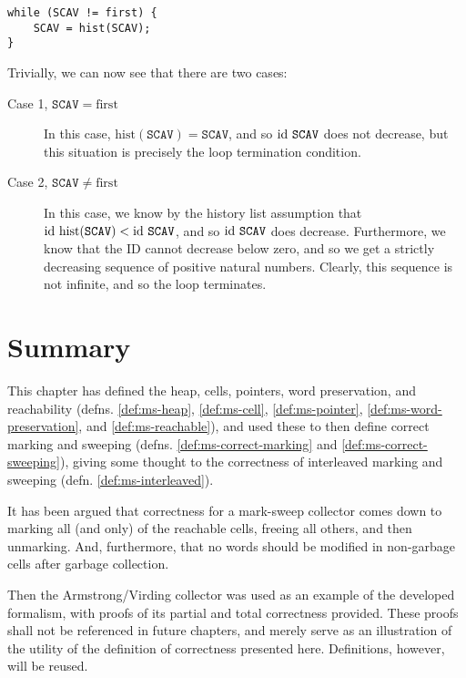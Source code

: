 \begin{lstlisting}
while (SCAV != first) {
    SCAV = hist(SCAV);
}
\end{lstlisting}

Trivially, we can now see that there are two cases:

\begin{description}
  \item[Case 1, $\mathtt{SCAV} = \mathrm{first}$] In this case,
    $\mathrm{hist}(\mathtt{SCAV}) = \mathtt{SCAV}$, and so
    $\mathrm{id}~\mathtt{SCAV}$ does not decrease, but this situation is
    precisely the loop termination condition.

  \item[Case 2, $\mathtt{SCAV} \neq \mathrm{first}$] In this case, we
    know by the history list assumption that
    $\mathrm{id}~\mathrm{hist}(\mathtt{SCAV}) < \mathrm{id}~\mathtt{SCAV}$, and so
    $\mathrm{id}~\mathtt{SCAV}$ does decrease. Furthermore, we know that the
    ID cannot decrease below zero, and so we get a strictly decreasing
    sequence of positive natural numbers. Clearly, this sequence is
    not infinite, and so the loop terminates.
\end{description}

\section{Summary}
\label{sec:marksweep-summary}

This chapter has defined the heap, cells, pointers, word preservation,
and reachability (defns.  \ref{def:ms-heap}, \ref{def:ms-cell},
\ref{def:ms-pointer}, \ref{def:ms-word-preservation}, and
\ref{def:ms-reachable}), and used these to then define correct marking
and sweeping (defns.  \ref{def:ms-correct-marking} and
\ref{def:ms-correct-sweeping}), giving some thought to the correctness
of interleaved marking and sweeping (defn. \ref{def:ms-interleaved}).

It has been argued that correctness for a mark-sweep collector comes
down to marking all (and only) of the reachable cells, freeing all
others, and then unmarking. And, furthermore, that no words should be
modified in non-garbage cells after garbage collection.

Then the Armstrong/Virding\cite{Armstrong95} collector was used as an
example of the developed formalism, with proofs of its partial and
total correctness provided. These proofs shall not be referenced in
future chapters, and merely serve as an illustration of the utility
of the definition of correctness presented here. Definitions, however,
will be reused.
